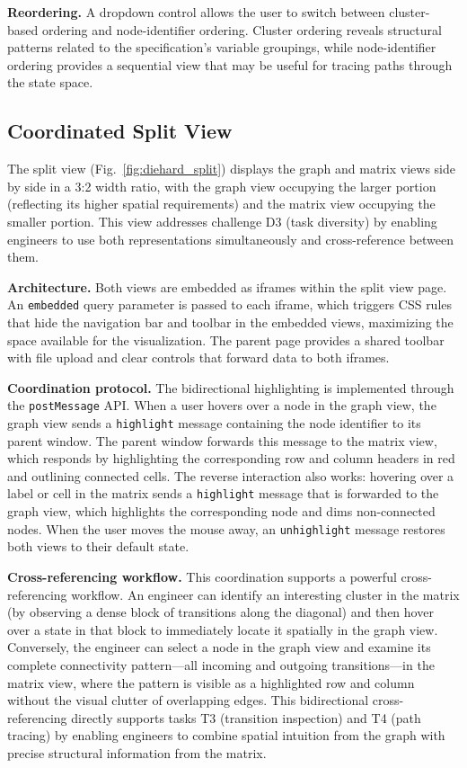 \documentclass[conference]{IEEEtran}
\begin{document}
\textbf{Reordering.} A dropdown control allows the user to switch between cluster-based ordering and node-identifier ordering. Cluster ordering reveals structural patterns related to the specification's variable groupings, while node-identifier ordering provides a sequential view that may be useful for tracing paths through the state space.

\subsection{Coordinated Split View}

The split view (Fig.~\ref{fig:diehard_split}) displays the graph and matrix views side by side in a 3:2 width ratio, with the graph view occupying the larger portion (reflecting its higher spatial requirements) and the matrix view occupying the smaller portion. This view addresses challenge D3 (task diversity) by enabling engineers to use both representations simultaneously and cross-reference between them.

\textbf{Architecture.} Both views are embedded as iframes within the split view page. An \texttt{embedded} query parameter is passed to each iframe, which triggers CSS rules that hide the navigation bar and toolbar in the embedded views, maximizing the space available for the visualization. The parent page provides a shared toolbar with file upload and clear controls that forward data to both iframes.

\textbf{Coordination protocol.} The bidirectional highlighting is implemented through the \texttt{postMessage} API. When a user hovers over a node in the graph view, the graph view sends a \texttt{highlight} message containing the node identifier to its parent window. The parent window forwards this message to the matrix view, which responds by highlighting the corresponding row and column headers in red and outlining connected cells. The reverse interaction also works: hovering over a label or cell in the matrix sends a \texttt{highlight} message that is forwarded to the graph view, which highlights the corresponding node and dims non-connected nodes. When the user moves the mouse away, an \texttt{unhighlight} message restores both views to their default state.

\textbf{Cross-referencing workflow.} This coordination supports a powerful cross-referencing workflow. An engineer can identify an interesting cluster in the matrix (by observing a dense block of transitions along the diagonal) and then hover over a state in that block to immediately locate it spatially in the graph view. Conversely, the engineer can select a node in the graph view and examine its complete connectivity pattern---all incoming and outgoing transitions---in the matrix view, where the pattern is visible as a highlighted row and column without the visual clutter of overlapping edges. This bidirectional cross-referencing directly supports tasks T3 (transition inspection) and T4 (path tracing) by enabling engineers to combine spatial intuition from the graph with precise structural information from the matrix.
\end{document}
